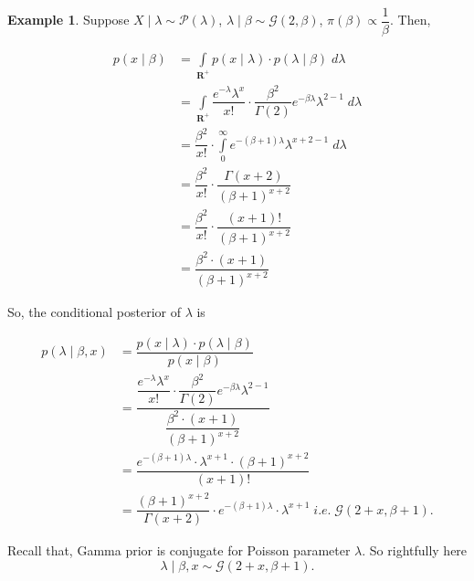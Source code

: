 \documentclass[12pt, a4paper]{article}
\theoremstyle{definition}
\newtheorem{example}{Example}
\begin{document}
\begin{example}
Suppose $X \mid \lambda \sim \mathcal{P}(\lambda)$, $\lambda \mid \beta \sim \mathcal{G}\left( 2, \beta \right)$, $\pi\left( \beta \right) \propto \dfrac{1}{\beta}$. Then,

\begin{align*}
p\left( x \mid \beta \right) &= \displaystyle{\int \limits_{\mathbf{R}^+} p\left( x \mid \lambda \right) \cdot p\left( \lambda \mid \beta \right) \; d\lambda} \\[0.5em]
&= \displaystyle{\int \limits_{\mathbf{R}^+} \dfrac{e^{- \lambda} \lambda^x}{x !} \cdot \dfrac{\beta^{2}}{\Gamma\left( 2 \right)} e^{-\beta \lambda} \lambda^{2-1} \; d\lambda} \\[0.5em]
&= \dfrac{\beta^{2}}{x!} \cdot \displaystyle{\int \limits_{0}^{\infty} e^{-\left( \beta + 1 \right)\lambda} \lambda^{x + 2 - 1} \; d\lambda} \\[0.5em]
&= \dfrac{\beta^{2}}{x!} \cdot \dfrac{\Gamma\left( x + 2 \right)}{\left( \beta + 1 \right)^{x + 2}} \\[0.5em]
&= \dfrac{\beta^{2}}{x!} \cdot \dfrac{\left( x + 1 \right)!}{\left( \beta + 1 \right)^{x + 2}} \\[0.5em]
&= \dfrac{\beta^{2} \cdot \left( x + 1 \right)}{\left( \beta + 1 \right)^{x + 2}}
\end{align*}

So, the conditional posterior of $\lambda$ is

\begin{align*}
p\left( \lambda \mid \beta, x \right) &= \dfrac{p\left( x \mid \lambda \right) \cdot p\left( \lambda \mid \beta \right)}{p\left( x \mid \beta \right)} \\[0.5em]
&= \dfrac{\dfrac{e^{- \lambda} \lambda^x}{x !} \cdot \dfrac{\beta^{2}}{\Gamma\left( 2 \right)} e^{-\beta \lambda} \lambda^{2-1}}{\dfrac{\beta^{2} \cdot \left( x + 1 \right)}{\left( \beta + 1 \right)^{x + 2}}} \\[0.5em]
&= \dfrac{e^{-\left( \beta + 1 \right)\lambda} \cdot \lambda^{x + 1} \cdot \left(\beta + 1\right)^{x + 2}}{\left( x + 1 \right)!} \\[0.5em]
&= \dfrac{\left(\beta + 1\right)^{x + 2}}{\Gamma\left( x + 2 \right)} \cdot e^{-\left( \beta + 1 \right)\lambda} \cdot \lambda^{x + 1} \; \textit{i.e.} \; \mathcal{G}\left( 2 + x, \beta + 1 \right).
\end{align*}

Recall that, Gamma prior is conjugate for Poisson parameter $\lambda$. So rightfully here $$\lambda \mid \beta, x \sim \mathcal{G}\left( 2 + x, \beta + 1 \right).$$ \\[0.5em]


\end{example}
\end{document}
